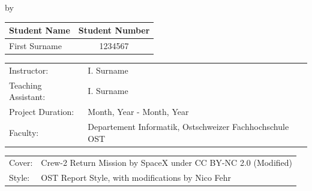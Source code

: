 \begin{titlepage}

\begin{center}

{\makeatletter
\largetitlestyle\fontsize{45}{45}\selectfont\@title
\makeatother}

{\makeatletter
\ifdefvoid{\@subtitle}{}{\bigskip\titlestyle\fontsize{20}{20}\selectfont\@subtitle}
\makeatother}

\bigskip
\bigskip

by

\bigskip
\bigskip

{\makeatletter
\largetitlestyle\fontsize{25}{25}\selectfont\@author 
\makeatother}

\bigskip
\bigskip

\setlength\extrarowheight{2pt}
\begin{tabular}{lc}
    Student Name & Student Number \\\midrule
    First Surname & 1234567 \\
\end{tabular}

\vfill

\begin{tabular}{ll}
    Instructor: & I. Surname \\
    Teaching Assistant: & I. Surname \\
    Project Duration: & Month, Year - Month, Year \\
    Faculty: & Departement Informatik, Ostschweizer Fachhochschule OST \\
\end{tabular}

\bigskip
\bigskip

\begin{tabular}{p{15mm}p{10cm}}
    Cover: & Crew-2 Return Mission by SpaceX under CC BY-NC 2.0 (Modified) \\
    Style: & OST Report Style, with modifications by Nico Fehr
\end{tabular}


\end{center}

\end{titlepage}
